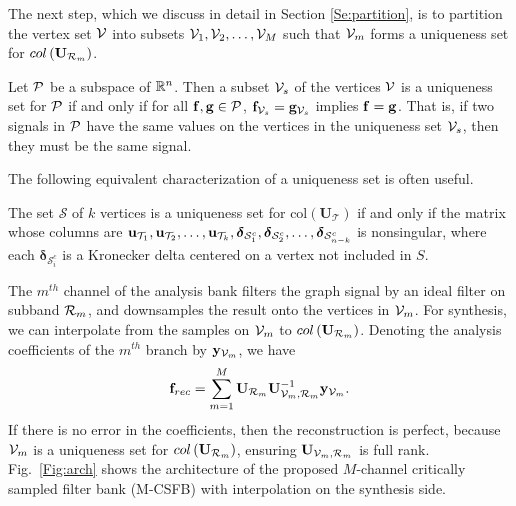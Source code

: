 \documentclass[journal, 10pt]{IEEEtran}
\begin{document}
The next step, which we discuss in detail in Section \ref{Se:partition}, is to partition the vertex set ${\mathcal{V}}$ into subsets ${\mathcal{V}}_1,{\mathcal{V}}_2,\ldots,{\mathcal{V}}_M$ such that ${\mathcal{V}}_m$ forms a uniqueness set for $\mbox{col}\left(\mathbf{U}_{{\cal R}_m}\right)$.
\begin{definition}[Uniqueness set \cite{pesenson_paley}] 
Let ${\cal P}$ be a subspace of $\mathbb{R}^n$. 
Then a subset ${\mathcal{V}}_s$ of the vertices ${\mathcal{V}}$ is a uniqueness set for 
${\cal P}$ if  and only if for all %
${\bf f},{\bf g} \in {\cal P}$,
${\bf f}_{{\mathcal{V}}_s}={\bf g}_{{\mathcal{V}}_s}$ implies ${\bf f}={\bf g}$. That is, if two signals in ${\cal P}$ have the same values on the vertices in the uniqueness set ${\mathcal{V}}_s$, then they must be the same signal.
\end{definition}
The following equivalent characterization of a uniqueness set is often useful.
\begin{lemma}\label{Le:eq_uniq}
The set $\mathcal{S}$ of $k$ vertices is a uniqueness set for $\mbox{col}({\mathbf{U}}_{\mathcal T})$ if and only if the matrix whose columns are ${\bf u}_{{\mathcal T}_1},{\bf u}_{{\mathcal T}_2},\ldots,{\bf u}_{{\mathcal T}_k}, {\boldsymbol \delta}_{{\mathcal{S}}^c_1}, {\boldsymbol \delta}_{{\mathcal{S}}^c_2}, \ldots, {\boldsymbol \delta}_{{\mathcal{S}}^c_{n-k}}$ is nonsingular,
where each ${\boldsymbol \delta}_{{\mathcal{S}}^c_i}$ is a Kronecker delta centered on a vertex not included in $S$. 
\end{lemma}
The $m^{th}$ channel of the analysis %
bank %
filters the graph signal by an ideal %
filter on subband ${\cal R}_m$, and downsamples the result onto the vertices in ${\mathcal{V}}_m$. For synthesis, we can interpolate from the samples on ${\mathcal{V}}_m$ to $\mbox{col}\left(\mathbf{U}_{{\cal R}_m}\right)$. Denoting the analysis coefficients of the $m^{th}$ branch by ${\bf y}_{{\mathcal{V}}_m}$, we have
\begin{align} \label{Eq:synth}
{\bf f}_{rec} = \sum_{m=1}^M  \mathbf{U}_{{\cal R}_m} \mathbf{U}_{\V_m,{\cal R}_m}^{-1} {\bf y}_{\V_m}.
\end{align}
If there is no error in the coefficients, then the reconstruction is perfect, because ${\mathcal{V}}_m$ is a uniqueness set for $\mbox{col}\left(\mathbf{U}_{{\cal R}_m}\right)$, ensuring $\mathbf{U}_{\V_m,{\cal R}_m}$ is full rank. Fig.\ \ref{Fig:arch} shows the architecture of the proposed $M$-channel critically sampled filter bank (M-CSFB) with interpolation on the synthesis side.
\end{document}
